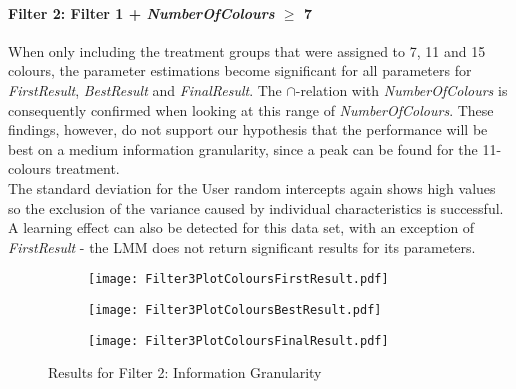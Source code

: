 \paragraph{Filter 2: Filter 1 + \textit{NumberOfColours} $\geq$ 7}
When only including the treatment groups that were assigned to 7, 11 and 15 colours, the parameter estimations become significant for all parameters for \textit{FirstResult}, \textit{BestResult} and \textit{FinalResult}. The \textbf{$\cap$}-relation with \textit{NumberOfColours} is consequently confirmed when looking at this range of \textit{NumberOfColours}. These findings, however, do not support our hypothesis that the performance will be best on a medium information granularity, since a peak can be found for the 11-colours treatment.\\
The standard deviation for the User random intercepts again shows high values so the exclusion of the variance caused by individual characteristics is successful.\\
A learning effect can also be detected for this data set, with an exception of \textit{FirstResult} - the \ac{LMM} does not return significant results for its parameters. 

\begin{figure}[H] %
\begin{center}
\begin{subfigure} 
\centering
\texttt{[image: Filter3PlotColoursFirstResult.pdf]}
\end{subfigure} 
\begin{subfigure} 
\centering
\texttt{[image: Filter3PlotColoursBestResult.pdf]}
\end{subfigure} 
\begin{subfigure}
\centering
\texttt{[image: Filter3PlotColoursFinalResult.pdf]}
\end{subfigure}   
  \caption[Results for Filter 2: Information Granularity]{Results for Filter 2: Information Granularity\footnotemark}
    \label{fig:Results for Filter 3: Information Granularity} 
\end{center}
\end{figure}

